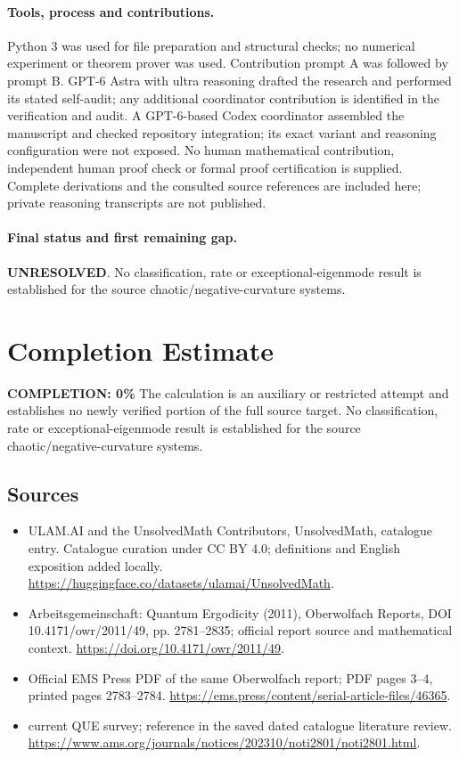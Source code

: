 \documentclass[11pt]{article}
\begin{document}
\paragraph{Tools, process and contributions.}
Python 3 was used for file preparation and structural checks; no numerical experiment or theorem prover was used. Contribution prompt A was followed by prompt B. GPT-6 Astra with ultra reasoning drafted the research and performed its stated self-audit; any additional coordinator contribution is identified in the verification and audit. A GPT-6-based Codex coordinator assembled the manuscript and checked repository integration; its exact variant and reasoning configuration were not exposed. No human mathematical contribution, independent human proof check or formal proof certification is supplied. Complete derivations and the consulted source references are included here; private reasoning transcripts are not published.

\paragraph{Final status and first remaining gap.}
\textbf{UNRESOLVED}. No classification, rate or exceptional-eigenmode result is established for the source chaotic/negative-curvature systems.

\section{Completion Estimate}
\noindent\textbf{COMPLETION: 0\%}
The calculation is an auxiliary or restricted attempt and establishes no newly verified portion of the full source target. No classification, rate or exceptional-eigenmode result is established for the source chaotic/negative-curvature systems.

\subsection{Sources}
\begin{itemize}
\item[\hypertarget{source:statement:1}{S1}] ULAM.AI and the UnsolvedMath Contributors, UnsolvedMath, catalogue entry. Catalogue curation under CC BY 4.0; definitions and English exposition added locally.
\url{https://huggingface.co/datasets/ulamai/UnsolvedMath}.
\item[\hypertarget{source:statement:2}{S2}] Arbeitsgemeinschaft: Quantum Ergodicity (2011), Oberwolfach Reports, DOI 10.4171/owr/2011/49, pp. 2781--2835; official report source and mathematical context.
\url{https://doi.org/10.4171/owr/2011/49}.
\item[\hypertarget{source:statement:3}{S3}] Official EMS Press PDF of the same Oberwolfach report; PDF pages 3--4, printed pages 2783--2784.
\url{https://ems.press/content/serial-article-files/46365}.
\item[\hypertarget{source:statement:4}{S4}] current QUE survey; reference in the saved dated catalogue literature review.
\url{https://www.ams.org/journals/notices/202310/noti2801/noti2801.html}.
\end{itemize}
\label{end:statement}
\end{document}
